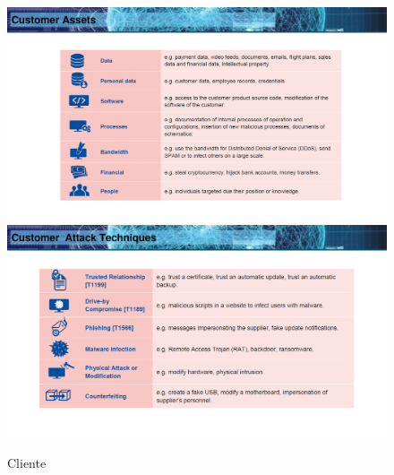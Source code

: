 \begin{figure}
    \centering
    \includegraphics[width=1\textwidth]{images/3.png}
    \includegraphics[width=1\textwidth]{images/4.png}
    \caption{Cliente}
    \label{fig:my_label2}
\end{figure}
